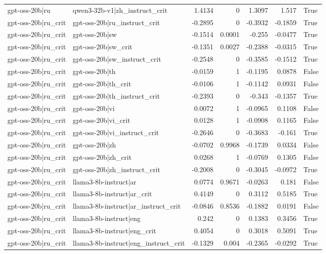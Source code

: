 \begin{table}
\begin{tabular}{l l r r r r l}
gpt-oss-20b|ru & qwen3-32b-v1|zh_instruct_crit & 1.4134 & 0 & 1.3097 & 1.517 & True \\
gpt-oss-20b|ru_crit & gpt-oss-20b|ru_instruct_crit & -0.2895 & 0 & -0.3932 & -0.1859 & True \\
gpt-oss-20b|ru_crit & gpt-oss-20b|sw & -0.1514 & 0.0001 & -0.255 & -0.0477 & True \\
gpt-oss-20b|ru_crit & gpt-oss-20b|sw_crit & -0.1351 & 0.0027 & -0.2388 & -0.0315 & True \\
gpt-oss-20b|ru_crit & gpt-oss-20b|sw_instruct_crit & -0.2548 & 0 & -0.3585 & -0.1512 & True \\
gpt-oss-20b|ru_crit & gpt-oss-20b|th & -0.0159 & 1 & -0.1195 & 0.0878 & False \\
gpt-oss-20b|ru_crit & gpt-oss-20b|th_crit & -0.0106 & 1 & -0.1142 & 0.0931 & False \\
gpt-oss-20b|ru_crit & gpt-oss-20b|th_instruct_crit & -0.2393 & 0 & -0.343 & -0.1357 & True \\
gpt-oss-20b|ru_crit & gpt-oss-20b|vi & 0.0072 & 1 & -0.0965 & 0.1108 & False \\
gpt-oss-20b|ru_crit & gpt-oss-20b|vi_crit & 0.0128 & 1 & -0.0908 & 0.1165 & False \\
gpt-oss-20b|ru_crit & gpt-oss-20b|vi_instruct_crit & -0.2646 & 0 & -0.3683 & -0.161 & True \\
gpt-oss-20b|ru_crit & gpt-oss-20b|zh & -0.0702 & 0.9968 & -0.1739 & 0.0334 & False \\
gpt-oss-20b|ru_crit & gpt-oss-20b|zh_crit & 0.0268 & 1 & -0.0769 & 0.1305 & False \\
gpt-oss-20b|ru_crit & gpt-oss-20b|zh_instruct_crit & -0.2008 & 0 & -0.3045 & -0.0972 & True \\
gpt-oss-20b|ru_crit & llama3-8b-instruct|ar & 0.0774 & 0.9671 & -0.0263 & 0.181 & False \\
gpt-oss-20b|ru_crit & llama3-8b-instruct|ar_crit & 0.4149 & 0 & 0.3112 & 0.5185 & True \\
gpt-oss-20b|ru_crit & llama3-8b-instruct|ar_instruct_crit & -0.0846 & 0.8536 & -0.1882 & 0.0191 & False \\
gpt-oss-20b|ru_crit & llama3-8b-instruct|eng & 0.242 & 0 & 0.1383 & 0.3456 & True \\
gpt-oss-20b|ru_crit & llama3-8b-instruct|eng_crit & 0.4054 & 0 & 0.3018 & 0.5091 & True \\
gpt-oss-20b|ru_crit & llama3-8b-instruct|eng_instruct_crit & -0.1329 & 0.004 & -0.2365 & -0.0292 & True \\

\end{tabular}
\end{table}
